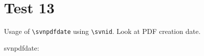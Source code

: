 \documentclass[12pt]{report}
\begin{document}
\chapter{Test 13}
Usage of \verb+\svnpdfdate+ using \verb+\svnid+.
Look at PDF creation date.

svnpdfdate: \svnpdfdate
\end{document}
